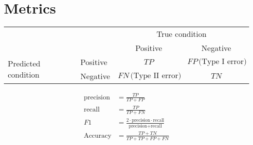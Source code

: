 \documentclass{book}
\begin{document}
\section{Metrics}

\begin{tabular}{l|l|c|c|}
\multicolumn{2}{c}{}&\multicolumn{2}{c}{True condition}\\
\cline{3-4}
\multicolumn{2}{c|}{}&Positive&Negative\\
\cline{2-4}
\multirow{2}{*}{Predicted condition}& Positive & $TP$ & $FP \, \mbox{(Type I error)}$\\
\cline{2-4}
& Negative & $FN \, \mbox{(Type II error)}$ & $TN$\\
\cline{2-4}
\end{tabular}

\begin{align*}
\mbox{precision} &= \frac{TP}{TP + FP} \\
\mbox{recall} &= \frac{TP}{TP + FN} \\
F1 &= \frac{2 \cdot \mbox{precision}\cdot \mbox{recall}}{\mbox{precision} + \mbox{recall}} \\
\mbox{Accuracy} &= \frac{TP+TN}{TP+TP+FP+FN}
\end{align*}

\end{document}
